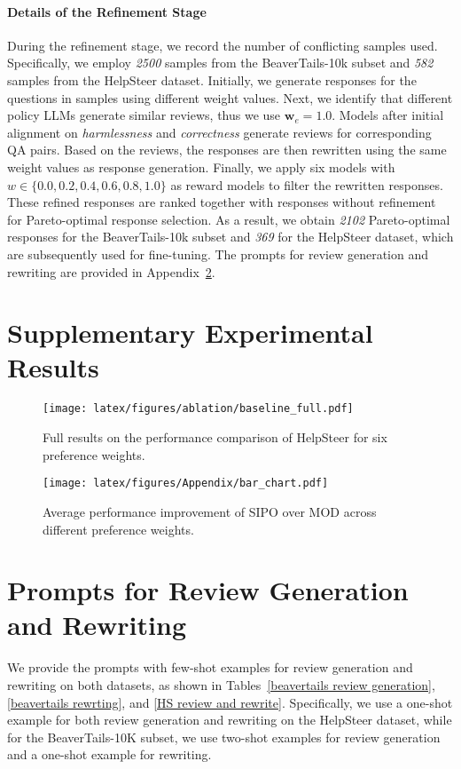 \paragraph{Details of the Refinement Stage}
During the refinement stage, we record the number of conflicting samples used. Specifically, we employ \textit{2500} samples from the BeaverTails-10k subset and \textit{582} samples from the HelpSteer dataset. Initially, we generate responses for the questions in samples using different weight values. 
Next, we identify that different policy LLMs generate similar reviews, thus we use $\textbf{w}_e = 1.0$. Models after initial alignment on \textit{harmlessness} and \textit{correctness} generate reviews for corresponding QA pairs. 
Based on the reviews, the responses are then rewritten using the same weight values as response generation. Finally, we apply six models with $w \in \{0.0, 0.2, 0.4, 0.6, 0.8, 1.0\}$ as reward models to filter the rewritten responses. 
These refined responses are ranked together with responses without refinement for Pareto-optimal response selection. 
As a result, we obtain \textit{2102} Pareto-optimal responses for the BeaverTails-10k subset and \textit{369} for the HelpSteer dataset, which are subsequently used for fine-tuning. The prompts for review generation and rewriting are provided in Appendix~\ref{appd C}.


\section{Supplementary Experimental Results}
\begin{figure}[H]
    \centering
    \texttt{[image: latex/figures/ablation/baseline\_full.pdf]}
    \caption{Full results on the performance comparison of HelpSteer for six preference weights. }
    \label{fig:baseline_full_helpsteer}
\end{figure}

\begin{figure}[H]
    \centering
    \texttt{[image: latex/figures/Appendix/bar\_chart.pdf]}
    \caption{Average performance improvement of SIPO over MOD across different preference weights. }
    \label{fig:avg increase}
\end{figure}

\section{Prompts for Review Generation and Rewriting}
\label{appd C}
We provide the prompts with few-shot examples for review generation and rewriting on both datasets, as shown in Tables~\ref{beavertails review generation}, \ref{beavertails rewrting}, and \ref{HS review and rewrite}. Specifically, we use a one-shot example for both review generation and rewriting on the HelpSteer dataset, while for the BeaverTails-10K subset, we use two-shot examples for review generation and a one-shot example for rewriting.

